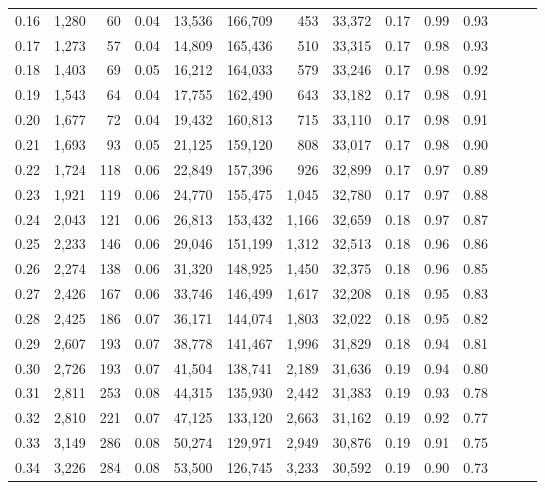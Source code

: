 \begin{tabular}{rrrrrrrrrrrrrr}
0.16 &  1,280 &   60 &  0.04 &   13,536 &  166,709 &     453 &  33,372 &  0.17 &  0.99 &      0.93 \\
0.17 &  1,273 &   57 &  0.04 &   14,809 &  165,436 &     510 &  33,315 &  0.17 &  0.98 &      0.93 \\
0.18 &  1,403 &   69 &  0.05 &   16,212 &  164,033 &     579 &  33,246 &  0.17 &  0.98 &      0.92 \\
0.19 &  1,543 &   64 &  0.04 &   17,755 &  162,490 &     643 &  33,182 &  0.17 &  0.98 &      0.91 \\
0.20 &  1,677 &   72 &  0.04 &   19,432 &  160,813 &     715 &  33,110 &  0.17 &  0.98 &      0.91 \\
0.21 &  1,693 &   93 &  0.05 &   21,125 &  159,120 &     808 &  33,017 &  0.17 &  0.98 &      0.90 \\
0.22 &  1,724 &  118 &  0.06 &   22,849 &  157,396 &     926 &  32,899 &  0.17 &  0.97 &      0.89 \\
0.23 &  1,921 &  119 &  0.06 &   24,770 &  155,475 &   1,045 &  32,780 &  0.17 &  0.97 &      0.88 \\
0.24 &  2,043 &  121 &  0.06 &   26,813 &  153,432 &   1,166 &  32,659 &  0.18 &  0.97 &      0.87 \\
0.25 &  2,233 &  146 &  0.06 &   29,046 &  151,199 &   1,312 &  32,513 &  0.18 &  0.96 &      0.86 \\
0.26 &  2,274 &  138 &  0.06 &   31,320 &  148,925 &   1,450 &  32,375 &  0.18 &  0.96 &      0.85 \\
0.27 &  2,426 &  167 &  0.06 &   33,746 &  146,499 &   1,617 &  32,208 &  0.18 &  0.95 &      0.83 \\
0.28 &  2,425 &  186 &  0.07 &   36,171 &  144,074 &   1,803 &  32,022 &  0.18 &  0.95 &      0.82 \\
0.29 &  2,607 &  193 &  0.07 &   38,778 &  141,467 &   1,996 &  31,829 &  0.18 &  0.94 &      0.81 \\
0.30 &  2,726 &  193 &  0.07 &   41,504 &  138,741 &   2,189 &  31,636 &  0.19 &  0.94 &      0.80 \\
0.31 &  2,811 &  253 &  0.08 &   44,315 &  135,930 &   2,442 &  31,383 &  0.19 &  0.93 &      0.78 \\
0.32 &  2,810 &  221 &  0.07 &   47,125 &  133,120 &   2,663 &  31,162 &  0.19 &  0.92 &      0.77 \\
0.33 &  3,149 &  286 &  0.08 &   50,274 &  129,971 &   2,949 &  30,876 &  0.19 &  0.91 &      0.75 \\
0.34 &  3,226 &  284 &  0.08 &   53,500 &  126,745 &   3,233 &  30,592 &  0.19 &  0.90 &      0.73 \\

\end{tabular}
